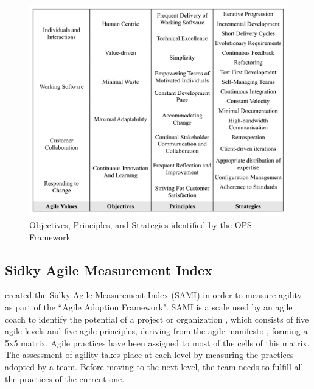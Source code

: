 \begin{figure} [H]
\centerline{\includegraphics[scale=0.75]{include/relatedwork/fig/ops.pdf}}
\caption{Objectives, Principles, and Strategies identified by the OPS Framework} 
\label{objectives_principles_strategies}
\end{figure} 

%

\subsection{Sidky Agile Measurement Index} %
\citet{sidky_dissertation} created the Sidky Agile Measurement Index (SAMI) in order to measure agility as part of the ``Agile Adoption Framework". SAMI is a scale used by an agile coach to identify the potential of a project or organization \cite{sidky}, which consists of five agile levels and five agile principles, deriving from the agile manifesto \cite{beck2001agile}, forming a 5x5 matrix. Agile practices have been assigned to most of the cells of this matrix. The assessment of agility takes place at each level by measuring the practices adopted by a team. Before moving to the next level, the team needs to fulfill all the practices of the current one.

